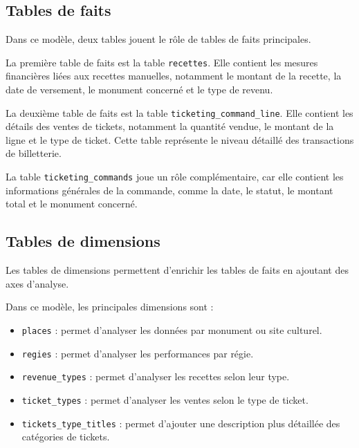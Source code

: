 \documentclass[12pt,a4paper]{report}
\begin{document}

\subsection{Tables de faits}

Dans ce modèle, deux tables jouent le rôle de tables de faits principales.

La première table de faits est la table \texttt{recettes}. Elle contient les mesures financières liées aux recettes manuelles, notamment le montant de la recette, la date de versement, le monument concerné et le type de revenu.

La deuxième table de faits est la table \texttt{ticketing\_command\_line}. Elle contient les détails des ventes de tickets, notamment la quantité vendue, le montant de la ligne et le type de ticket. Cette table représente le niveau détaillé des transactions de billetterie.

La table \texttt{ticketing\_commands} joue un rôle complémentaire, car elle contient les informations générales de la commande, comme la date, le statut, le montant total et le monument concerné.


\subsection{Tables de dimensions}

Les tables de dimensions permettent d’enrichir les tables de faits en ajoutant des axes d’analyse.

Dans ce modèle, les principales dimensions sont :

\begin{itemize}
	\item \texttt{places} : permet d’analyser les données par monument ou site culturel.
	\item \texttt{regies} : permet d’analyser les performances par régie.
	\item \texttt{revenue\_types} : permet d’analyser les recettes selon leur type.
	\item \texttt{ticket\_types} : permet d’analyser les ventes selon le type de ticket.
	\item \texttt{tickets\_type\_titles} : permet d’ajouter une description plus détaillée des catégories de tickets.
\end{itemize}
\end{document}
